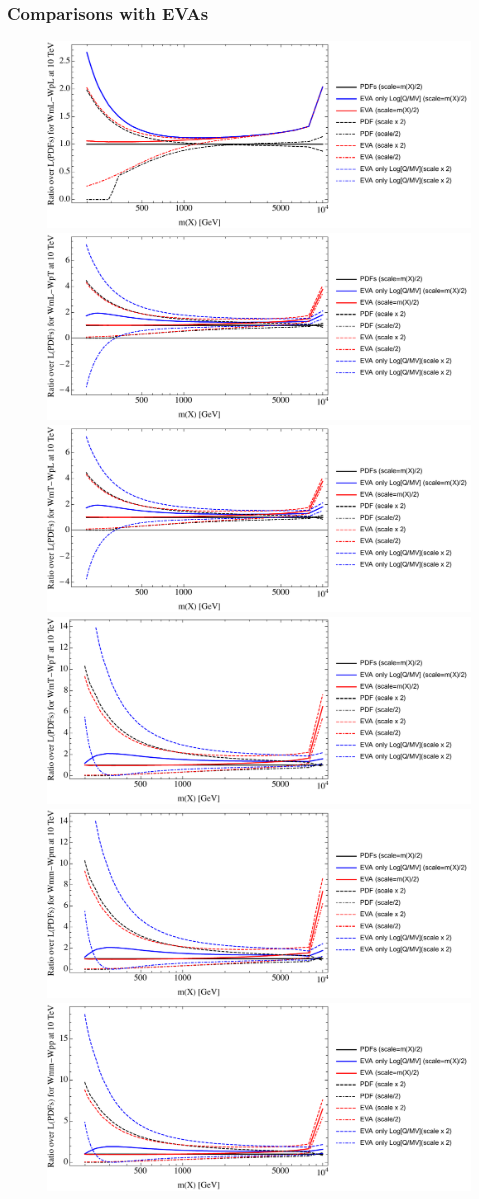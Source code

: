 \documentclass[a4paper,11pt]{article}
\begin{document}
\clearpage
\subsubsection{Comparisons with EVAs}

\begin{figure}[ht]
\includegraphics[width=0.46\linewidth]{PlotLumi/10TeV/ratios/WmL-WpL.pdf}
\includegraphics[width=0.46\linewidth]{PlotLumi/10TeV/ratios/WmL-WpT.pdf}
\includegraphics[width=0.46\linewidth]{PlotLumi/10TeV/ratios/WmT-WpL.pdf}
\includegraphics[width=0.46\linewidth]{PlotLumi/10TeV/ratios/WmT-WpT.pdf}
\includegraphics[width=0.46\linewidth]{PlotLumi/10TeV/ratios/Wmm-Wpm.pdf}
\includegraphics[width=0.46\linewidth]{PlotLumi/10TeV/ratios/Wmm-Wpp.pdf}
\end{figure}
\end{document}
